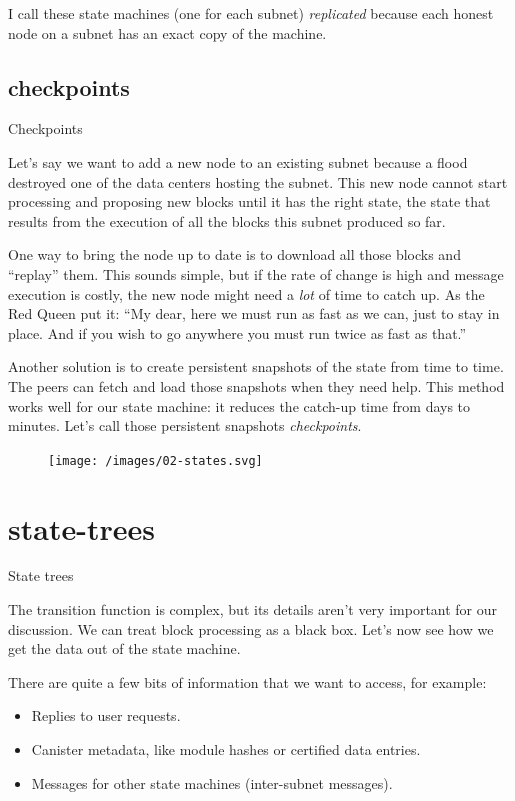 \documentclass{article}
\begin{document}
I call these state machines (one for each subnet) \emph{replicated} because each honest node on a subnet has an exact copy of the machine.

\subsection{checkpoints}{Checkpoints}

Let's say we want to add a new node to an existing subnet because a flood destroyed one of the data centers hosting the subnet.
This new node cannot start processing and proposing new blocks until it has the right state, the state that results from the execution of all the blocks this subnet produced so far.

One way to bring the node up to date is to download all those blocks and ``replay'' them.
This sounds simple, but if the rate of change is high and message execution is costly, the new node might need a \emph{lot} of time to catch up.
As the Red Queen put it: ``My dear, here we must run as fast as we can, just to stay in place.
And if you wish to go anywhere you must run twice as fast as that.''

Another solution is to create persistent snapshots of the state from time to time.
The peers can fetch and load those snapshots when they need help.
This method works well for our state machine: it reduces the catch-up time from days to minutes.
Let's call those persistent snapshots \emph{checkpoints}.

\begin{figure}[grayscale-diagram]
\texttt{[image: /images/02-states.svg]}
\end{figure}

\section{state-trees}{State trees}

The transition function is complex, but its details aren't very important for our discussion.
We can treat block processing as a black box.
Let's now see how we get the data out of the state machine.

There are quite a few bits of information that we want to access, for example:
\begin{itemize}
\item Replies to user requests.
\item Canister metadata, like module hashes or certified data entries.
\item Messages for other state machines (inter-subnet messages).
\end{itemize}
\end{document}
